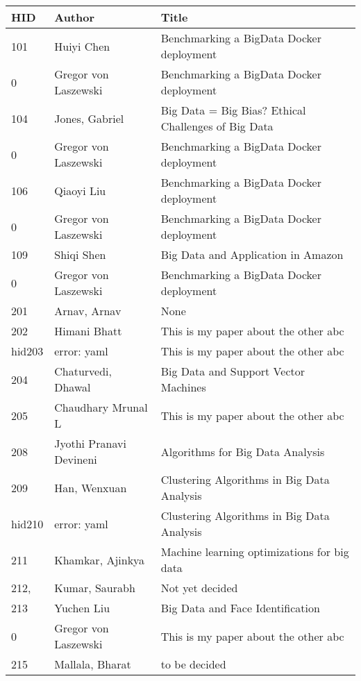 \documentclass[12pt]{book}
\begin{document}
\begin{footnotesize}
\begin{longtable}{|p{1cm}p{5cm}p{9cm}|}
\hline \textbf{HID} & \textbf{Author} & \textbf{Title} \\ \hline \hline

101 & Huiyi Chen & Benchmarking a BigData Docker deployment  \\
\hline
0 & Gregor von Laszewski & Benchmarking a BigData Docker deployment  \\
\hline
104 & Jones, Gabriel & Big Data = Big Bias? Ethical Challenges of Big Data  \\
\hline
0 & Gregor von Laszewski & Benchmarking a BigData Docker deployment  \\
\hline
106 & Qiaoyi Liu & Benchmarking a BigData Docker deployment  \\
\hline
0 & Gregor von Laszewski & Benchmarking a BigData Docker deployment  \\
\hline
109 & Shiqi Shen & Big Data and Application in Amazon  \\
\hline
0 & Gregor von Laszewski & Benchmarking a BigData Docker deployment  \\
\hline
201 & Arnav, Arnav & None  \\
\hline
202 & Himani Bhatt & This is my paper about the other abc  \\
\hline
hid203 & error: yaml & This is my paper about the other abc  \\
\hline
204 & Chaturvedi, Dhawal & Big Data and Support Vector Machines  \\
\hline
205 & Chaudhary Mrunal L & This is my paper about the other abc  \\
\hline
208 & Jyothi Pranavi Devineni & Algorithms for Big Data Analysis  \\
\hline
209 & Han, Wenxuan & Clustering Algorithms in Big Data Analysis  \\
\hline
hid210 & error: yaml & Clustering Algorithms in Big Data Analysis  \\
\hline
211 & Khamkar, Ajinkya & Machine learning optimizations for big data  \\
\hline
212, & Kumar, Saurabh & Not yet decided  \\
\hline
213 & Yuchen Liu & Big Data and Face Identification  \\
\hline
0 & Gregor von Laszewski & This is my paper about the other abc  \\
\hline
215 & Mallala, Bharat & to be decided  \\

\end{longtable}
\end{footnotesize}
\end{document}
